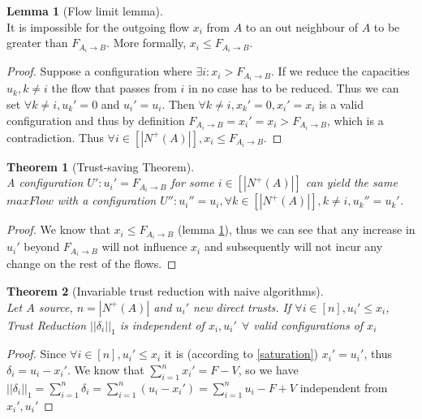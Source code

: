 \documentclass[11pt]{article}
\newtheorem{theorem}{Theorem}[section]
\theoremstyle{definition}
\theoremstyle{corollary}
\theoremstyle{lemma}
\newtheorem{lemma}{Lemma}[section]
\begin{document}
    \begin{lemma}[Flow limit lemma] \ \\
       \label{flowlimit}
       It is impossible for the outgoing flow $x_i$ from $A$ to an out neighbour of $A$ to be greater than
       $F_{A_i \rightarrow B}$. More formally, $x_i \leq F_{A_i \rightarrow B}$.
    \end{lemma}
    \begin{proof}
       Suppose a configuration where $\exists i : x_i > F_{A_i \rightarrow B}$. If we reduce the capacities $u_k, k \neq i$
       the flow that passes from $i$ in no case has to be reduced. Thus we can set $\forall k \neq i, u_k' = 0$ and $u_i' =
       u_i$. Then $\forall k \neq i,x_k' = 0, x_i' = x_i$ is a valid configuration and thus by definition $F_{A_i \rightarrow
       B} = x_i' = x_i > F_{A_i \rightarrow B}$, which is a contradiction. Thus $\forall i \in [|N^{+}(A)|], x_i \leq
       F_{A_i \rightarrow B}$.
    \end{proof}

    \begin{theorem}[Trust-saving Theorem] \ \\
       \label{trustsave}
       A configuration $U' : u_i' = F_{A_i \rightarrow B}$ for some $i \in [|N^{+}(A)|]$ can yield the same $maxFlow$ with a
       configuration $U'' : u_i'' = u_i, \forall k \in [|N^{+}(A)|], k \neq i, u_k'' = u_k'$.
    \end{theorem}
    \begin{proof}
       We know that $x_i \leq F_{A_i \rightarrow B}$ (lemma \ref{flowlimit}), thus we can see that any increase in $u_i'$
       beyond $F_{A_i \rightarrow B}$ will not influence $x_i$ and subsequently will not incur any change on the rest of the
       flows.
    \end{proof}

    \begin{theorem}[Invariable trust reduction with naive algorithms] \ \\
       \label{invariability}
       Let $A$ source, $n = |N^{+}(A)|$ and $u_i'$ new direct trusts. If $\forall i \in [n],u_i' \leq x_i$,
       Trust Reduction $||\delta_i||_1$ is independent of $x_i, u_i' \:\: \forall$ valid configurations of $x_i$
    \end{theorem}
    \begin{proof} 
       Since $\forall i \in [n],u_i' \leq x_i$ it is (according to \ref{saturation}) $x_i' = u_i'$, thus
       $\delta_i = u_i - x_i'$. We know that $\sum\limits_{i=1}^{n}x_i' = F - V$, so we have $||\delta_i||_1 =
       \sum\limits_{i=1}^{n}\delta_i = \sum\limits_{i=1}^{n}(u_i - x_i') = \sum\limits_{i=1}^{n}u_i - F + V$ independent
       from $x_i', u_i'$
    \end{proof}
\end{document}
